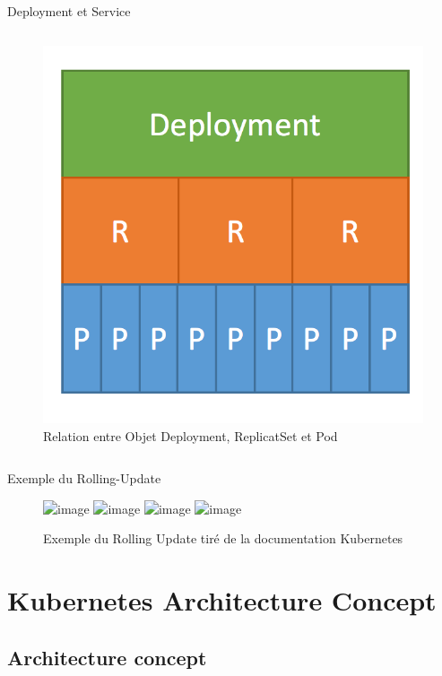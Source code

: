 \documentclass{bredelebeamer}
\begin{document}
\begin{frame}{Deployment et Service}
\begin{columns}
\begin{column}{0.4\textwidth}
\begin{figure}
\includegraphics[scale=0.4]{images/img18.png}
\caption{Relation entre Objet Deployment, ReplicatSet et Pod}
\end{figure}

\end{column}
\end{columns}
\end{frame}
\begin{frame}{Exemple du Rolling-Update}
\begin{figure}
\centering
\includegraphics<1>[scale=0.25]{images/img19.png}
\includegraphics<2>[scale=0.25]{images/img20.png}
\includegraphics<3>[scale=0.25]{images/img21.png}
\includegraphics<4>[scale=0.25]{images/img22.png}
\caption{Exemple du Rolling Update tiré de la documentation Kubernetes}
\end{figure}
\end{frame}

\section{Kubernetes Architecture Concept}
\subsection{Architecture concept}
\end{document}
